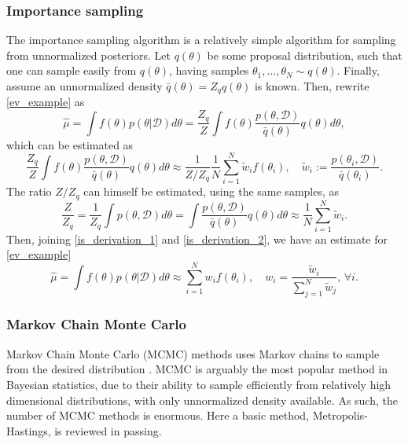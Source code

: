 \subsubsection{Importance sampling}
The importance sampling algorithm \cite{Robert_2005} is a relatively simple algorithm for sampling from unnormalized posteriors. Let $q(\theta)$ be some proposal distribution, such that one can sample easily from $q(\theta)$, having samples $\theta_1,\ldots,\theta_N \sim q(\theta)$. Finally, assume an unnormalized density $\bar{q}(\theta) = Z_q q(\theta)$ is known. Then, rewrite \eqref{ev_example} as 
\begin{equation}\label{is_rewrite}
\hat{\mu} = \int f(\theta) p(\theta|\mathcal{D}) d\theta = 
\frac{Z_q}{Z} \int f(\theta) \frac{p(\theta,\mathcal{D})}{\bar{q}(\theta)} q(\theta) d\theta,
\end{equation}
which can be estimated as
\begin{equation}\label{is_derivation_1}
 \frac{Z_q}{Z} \int f(\theta) \frac{p(\theta,\mathcal{D})}{\bar{q}(\theta)} q(\theta) d\theta \approx \frac{1}{Z/Z_q} \frac{1}{N} \sum_{i=1}^N \tilde{w}_i f(\theta_i), \quad \tilde{w}_i := \frac{p(\theta_i,\mathcal{D})}{\bar{q}(\theta_i)}.
\end{equation}
The ratio $Z/Z_q$ can himself be estimated, using the same samples, as
\begin{equation}\label{is_derivation_2}
\frac{Z}{Z_q} = \frac{1}{Z_q} \int p(\theta,\mathcal{D}) d \theta = \int \frac{p(\theta,\mathcal{D})}{\bar{q}(\theta)} q(\theta) d\theta \approx \frac{1}{N} \sum_{i=1}^N \tilde{w}_i.
\end{equation}
Then, joining \eqref{is_derivation_1} and \eqref{is_derivation_2}, we have an estimate for \eqref{ev_example} 
\begin{equation}
 \hat{\mu} = \int f(\theta) p(\theta|\mathcal{D}) d\theta \approx \sum_{i=1}^N w_i f(\theta_i), \quad w_i = \frac{\tilde{w}_i}{\sum_{j=1}^N \tilde{w}_j}, \, \forall i.
\end{equation}

\subsubsection{Markov Chain Monte Carlo}
Markov Chain Monte Carlo (MCMC) methods uses Markov chains to sample from the desired distribution \cite{Robert_2005,Brooks_2011}. MCMC is arguably the most popular method in Bayesian statistics, due to their ability to sample efficiently from relatively high dimensional distributions, with only unnormalized density available. As such, the number of MCMC methods is enormous. Here a basic method, Metropolis-Hastings, is reviewed in passing.

